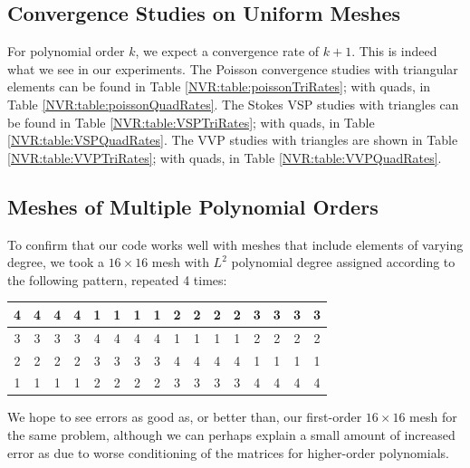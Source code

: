 \subsection{Convergence Studies on Uniform Meshes}
For polynomial order $k$, we expect a convergence rate of $k+1$.  This is indeed what we see in our experiments.  The Poisson convergence studies with triangular elements can be found in Table \ref{NVR:table:poissonTriRates}; with quads, in Table \ref{NVR:table:poissonQuadRates}.  The Stokes VSP studies with triangles can be found in Table \ref{NVR:table:VSPTriRates}; with quads, in Table \ref{NVR:table:VSPQuadRates}.  The VVP studies with triangles are shown in Table \ref{NVR:table:VVPTriRates}; with quads, in Table \ref{NVR:table:VVPQuadRates}.


\subsection{Meshes of Multiple Polynomial Orders}\label{NVR:sec:mixedMeshes}
To confirm that our code works well with meshes that include elements of varying degree, we took a $16 \times 16$ mesh with $L^{2}$ polynomial degree assigned according to the following pattern, repeated 4 times:
\\
\begin{center}
\begin{tabular}{| c | c | c | c || c | c | c | c || c | c | c | c || c | c | c | c |}
\hline
4 &4 &4 &4  &1 &1 &1 &1  &2 &2 &2 &2  &3 &3 &3 &3 \\
\hline
3 &3 &3 &3  &4 &4 &4 &4  &1 &1 &1 &1  &2 &2 &2 &2 \\
\hline
2 &2 &2 &2  &3 &3 &3 &3  &4 &4 &4 &4  &1 &1 &1 &1 \\
\hline
1 &1 &1 &1  &2 &2 &2 &2  &3 &3 &3 &3  &4 &4 &4 &4 \\
\hline
\end{tabular}
\end{center}
\vspace{0.1in}
We hope to see errors as good as, or better than, our first-order $16 \times 16$ mesh for the same problem, although we can perhaps explain a small amount of increased error as due to worse conditioning of the matrices for higher-order polynomials.


